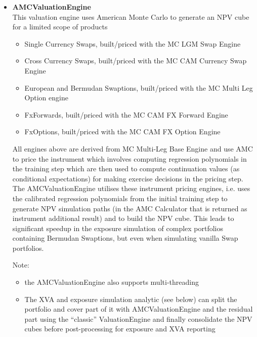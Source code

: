 \documentclass[12pt, a4paper]{report}
\begin{document}
\begin{itemize}
  N threads. Within each thread, the engine sets the essential thread-local singleton
  (the evaluation date), builds a clone of the full market, builds a local scenario sim market, builds
  the respective sub-portfolio linked to the thread's local market, builds and runs the usual
  ValuationEngine; the engine then populates a ``mini netting set NPV cube'' for
  the sub-portfolio. Because the engine parallelises by splitting the portfolio and because market
  building causes a fixed computational overhead, we need a sufficiently large full portfolio and
  sufficiently large sub-portfolios to achieve a significant speed up with this approach, i.e.
  overall processing time not too far above the optimal limit of 1 / N times the
  single-threaded processing time.
\item {\bf AMCValuationEngine} \\
  This valuation engine uses American Monte Carlo to generate an NPV cube for a limited scope of
  products
  \begin{itemize}
  \item Single Currency Swaps, built/priced with the MC LGM Swap Engine
  \item Cross Currency Swaps, built/priced with the MC CAM Currency Swap Engine
  \item European and Bermudan Swaptions, built/priced with the MC Multi Leg Option engine
  \item FxForwards, built/priced with the MC CAM FX Forward Engine
  \item FxOptions, built/priced with the MC CAM FX Option Engine
  \end{itemize}
  All engines above are derived from MC Multi-Leg Base Engine and use AMC to price the instrument
  which involves computing regression polynomials in the training step which are then used to compute
  continuation values (as conditional expectations) for making exercise decisions in the pricing step.
  The AMCValuationEngine utilises these instrument pricing engines, i.e. uses the calibrated
  regression polynomials from the initial training step to generate NPV simulation paths (in the AMC
  Calculator that is returned as instrument additional result) and to build the NPV cube.
  This leads to significant speedup in the exposure simulation of complex portfolios containing
  Bermudan Swaptions, but even when simulating vanilla Swap portfolios.
  
  Note:
  \begin{itemize}
  \item the AMCValuationEngine also supports multi-threading
  \item The XVA and exposure simulation analytic (see below) can split the portfolio and cover part
    of it with AMCValuationEngine and the residual part using the ``classic'' ValuationEngine and
    finally consolidate the NPV cubes before post-processing for exposure and XVA reporting
  \end{itemize}

\end{itemize}
\end{document}

